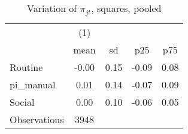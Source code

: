 \begin{table}[htbp]\centering
\def\sym#1{\ifmmode^{#1}\else\(^{#1}\)\fi}
\caption{Variation of $\pi_{jt}$, squares, pooled}
\begin{tabular}{l*{1}{cccc}}
\toprule
                    &\multicolumn{1}{c}{(1)}&            &            &            \\
                    &        mean&          sd&         p25&         p75\\
\midrule
Routine             &       -0.00&        0.15&       -0.09&        0.08\\
pi\_manual           &        0.01&        0.14&       -0.07&        0.09\\
Social              &        0.00&        0.10&       -0.06&        0.05\\
\midrule
Observations        &        3948&            &            &            \\
\bottomrule
\end{tabular}
\end{table}
